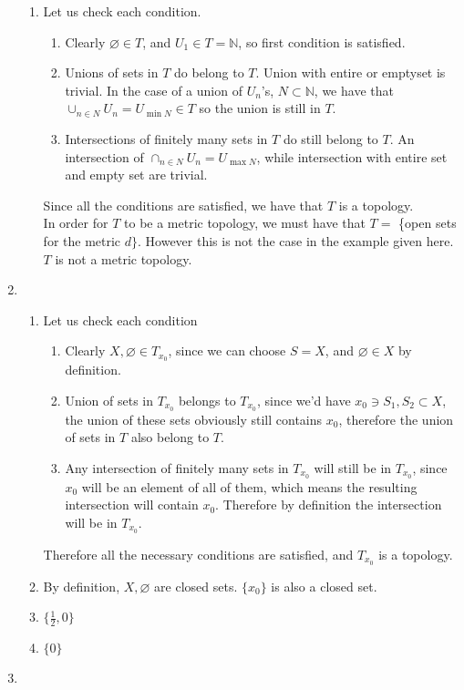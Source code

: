 \documentclass{article}
\newcommand{\N}{\mathbb{N}}
\renewcommand{\emptyset}{\varnothing}
\theoremstyle{remark}
\theoremstyle{example}
\theoremstyle{examples}
\begin{document}
\begin{enumerate}
\begin{enumerate}
			\item Let us check each condition.
			\begin{enumerate}
				\item Clearly $\emptyset \in T$, and $U_1 \in T = \N$, so first condition is satisfied.
				\item Unions of sets in $T$ do belong to $T$. Union with entire or emptyset is trivial. In the case of a union of $U_n$'s, $N \subset \N$, we have that $\cup_{n \in N} U_n = U_{\min N} \in T$ so the union is still in $T$.
				\item Intersections of finitely many sets in $T$ do still belong to $T$. An intersection of $\cap_{n \in N} U_n = U_{\max N}$, while intersection with entire set and empty set are trivial.
			\end{enumerate}
			Since all the conditions are satisfied, we have that $T$ is a topology.\\
			In order for $T$ to be a metric topology, we must have that $T =$ \{open sets for the metric $d\}$. However this is not the case in the example given here. $T$ is not a metric topology.
		\end{enumerate}
		\item \begin{enumerate}
			\item Let us check each condition
			\begin{enumerate}
				\item Clearly $X, \emptyset \in T_{x_0}$, since we can choose $S=X$, and $\emptyset \in X$ by definition.
				\item Union of sets in $T_{x_0}$ belongs to $T_{x_0}$, since we'd have $x_0 \ni S_1, S_2 \subset X$, the union of these sets obviously still contains $x_0$, therefore the union of sets in $T$ also belong to $T$.
				\item Any intersection of finitely many sets in $T_{x_0}$ will still be in $T_{x_0}$, since $x_0$ will be an element of all of them, which means the resulting intersection will contain $x_0$. Therefore by definition the intersection will be in $T_{x_0}$.
			\end{enumerate}
			Therefore all the necessary conditions are satisfied, and $T_{x_0}$ is a topology.
			\item By definition, $X, \emptyset$ are closed sets. $\{x_0\}$ is also a closed set.
			\item $\{\frac12, 0\}$
			\item $\{0\}$
		\end{enumerate}
		\item \begin{enumerate}

\end{enumerate}
\end{enumerate}
\end{document}
